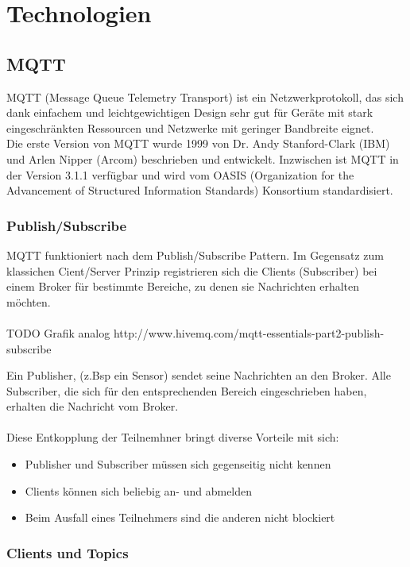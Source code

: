 \chapter{Technologien}
\label{chap:technologien}

\section{MQTT}
MQTT (Message Queue Telemetry Transport) ist ein Netzwerkprotokoll, das sich dank einfachem und leichtgewichtigen Design sehr gut für Geräte mit stark eingeschränkten Ressourcen und Netzwerke mit geringer Bandbreite eignet. 
\\
Die erste Version von MQTT wurde 1999 von Dr. Andy Stanford-Clark (IBM) und Arlen Nipper (Arcom) beschrieben und entwickelt. Inzwischen ist MQTT in der Version 3.1.1 verfügbar und wird vom OASIS (Organization for the Advancement of Structured Information Standards) Konsortium standardisiert.


\subsection{Publish/Subscribe}
MQTT funktioniert nach dem Publish/Subscribe Pattern. Im Gegensatz zum klassichen Cient/Server Prinzip registrieren sich die Clients (Subscriber) bei einem Broker für bestimmte Bereiche, zu denen sie Nachrichten erhalten möchten. 
\\ \\
TODO Grafik analog http://www.hivemq.com/mqtt-essentials-part2-publish-subscribe

\par
Ein Publisher, (z.Bsp ein Sensor) sendet seine Nachrichten an den Broker. Alle Subscriber, die sich für den entsprechenden Bereich eingeschrieben haben, erhalten die Nachricht vom Broker. 
\\ \\
Diese Entkopplung der Teilnemhner bringt diverse Vorteile mit sich:

\begin{itemize}
\item Publisher und Subscriber müssen sich gegenseitig nicht kennen
\item Clients können sich beliebig an- und abmelden
\item Beim Ausfall eines Teilnehmers sind die anderen nicht blockiert
\end{itemize}

\subsection{Clients und Topics}

